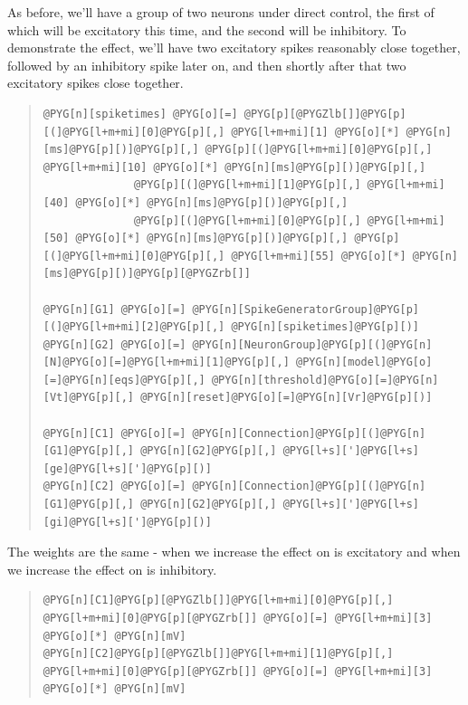 \documentclass[letterpaper,10pt,english]{manual}
\begin{document}
As before, we'll have a group of two neurons under direct control, the first
of which will be excitatory this time, and the second will be inhibitory. To
demonstrate the effect, we'll have two excitatory spikes reasonably close
together, followed by an inhibitory spike later on, and then shortly after
that two excitatory spikes close together.
\begin{quote}

\begin{Verbatim}[commandchars=@\[\]]
@PYG[n][spiketimes] @PYG[o][=] @PYG[p][@PYGZlb[]]@PYG[p][(]@PYG[l+m+mi][0]@PYG[p][,] @PYG[l+m+mi][1] @PYG[o][*] @PYG[n][ms]@PYG[p][)]@PYG[p][,] @PYG[p][(]@PYG[l+m+mi][0]@PYG[p][,] @PYG[l+m+mi][10] @PYG[o][*] @PYG[n][ms]@PYG[p][)]@PYG[p][,]
              @PYG[p][(]@PYG[l+m+mi][1]@PYG[p][,] @PYG[l+m+mi][40] @PYG[o][*] @PYG[n][ms]@PYG[p][)]@PYG[p][,]
              @PYG[p][(]@PYG[l+m+mi][0]@PYG[p][,] @PYG[l+m+mi][50] @PYG[o][*] @PYG[n][ms]@PYG[p][)]@PYG[p][,] @PYG[p][(]@PYG[l+m+mi][0]@PYG[p][,] @PYG[l+m+mi][55] @PYG[o][*] @PYG[n][ms]@PYG[p][)]@PYG[p][@PYGZrb[]]

@PYG[n][G1] @PYG[o][=] @PYG[n][SpikeGeneratorGroup]@PYG[p][(]@PYG[l+m+mi][2]@PYG[p][,] @PYG[n][spiketimes]@PYG[p][)]
@PYG[n][G2] @PYG[o][=] @PYG[n][NeuronGroup]@PYG[p][(]@PYG[n][N]@PYG[o][=]@PYG[l+m+mi][1]@PYG[p][,] @PYG[n][model]@PYG[o][=]@PYG[n][eqs]@PYG[p][,] @PYG[n][threshold]@PYG[o][=]@PYG[n][Vt]@PYG[p][,] @PYG[n][reset]@PYG[o][=]@PYG[n][Vr]@PYG[p][)]

@PYG[n][C1] @PYG[o][=] @PYG[n][Connection]@PYG[p][(]@PYG[n][G1]@PYG[p][,] @PYG[n][G2]@PYG[p][,] @PYG[l+s][']@PYG[l+s][ge]@PYG[l+s][']@PYG[p][)]
@PYG[n][C2] @PYG[o][=] @PYG[n][Connection]@PYG[p][(]@PYG[n][G1]@PYG[p][,] @PYG[n][G2]@PYG[p][,] @PYG[l+s][']@PYG[l+s][gi]@PYG[l+s][']@PYG[p][)]
\end{Verbatim}
\end{quote}

The weights are the same - when we increase  the effect on  is excitatory
and when we increase  the effect on  is inhibitory.
\begin{quote}

\begin{Verbatim}[commandchars=@\[\]]
@PYG[n][C1]@PYG[p][@PYGZlb[]]@PYG[l+m+mi][0]@PYG[p][,] @PYG[l+m+mi][0]@PYG[p][@PYGZrb[]] @PYG[o][=] @PYG[l+m+mi][3] @PYG[o][*] @PYG[n][mV]
@PYG[n][C2]@PYG[p][@PYGZlb[]]@PYG[l+m+mi][1]@PYG[p][,] @PYG[l+m+mi][0]@PYG[p][@PYGZrb[]] @PYG[o][=] @PYG[l+m+mi][3] @PYG[o][*] @PYG[n][mV]
\end{Verbatim}
\end{quote}
\end{document}
